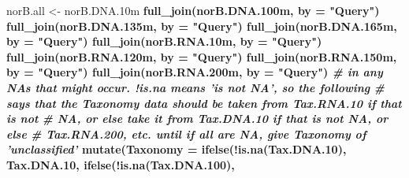 \documentclass[11 pt,]{article}
\newenvironment{Shaded}{\begin{snugshade}}{\end{snugshade}}
\newcommand{\KeywordTok}[1]{\textcolor[rgb]{0.13,0.29,0.53}{\textbf{#1}}}
\newcommand{\DataTypeTok}[1]{\textcolor[rgb]{0.13,0.29,0.53}{#1}}
\newcommand{\DecValTok}[1]{\textcolor[rgb]{0.00,0.00,0.81}{#1}}
\newcommand{\StringTok}[1]{\textcolor[rgb]{0.31,0.60,0.02}{#1}}
\newcommand{\CommentTok}[1]{\textcolor[rgb]{0.56,0.35,0.01}{\textit{#1}}}
\newcommand{\OperatorTok}[1]{\textcolor[rgb]{0.81,0.36,0.00}{\textbf{#1}}}
\newcommand{\NormalTok}[1]{#1}
\begin{document}
\begin{Shaded}
\begin{Highlighting}[]
\NormalTok{norB.all <-}\StringTok{ }\NormalTok{norB.DNA.10m }\OperatorTok{%
\KeywordTok{full_join}\NormalTok{(norB.DNA.100m, }\DataTypeTok{by =} \StringTok{"Query"}\NormalTok{) }\OperatorTok{%
\StringTok{    }\KeywordTok{full_join}\NormalTok{(norB.DNA.135m, }\DataTypeTok{by =} \StringTok{"Query"}\NormalTok{) }\OperatorTok{%
\StringTok{    }\KeywordTok{full_join}\NormalTok{(norB.DNA.165m, }\DataTypeTok{by =} \StringTok{"Query"}\NormalTok{) }\OperatorTok{%
\StringTok{    }\KeywordTok{full_join}\NormalTok{(norB.RNA.10m, }\DataTypeTok{by =} \StringTok{"Query"}\NormalTok{) }\OperatorTok{%
\StringTok{    }\KeywordTok{full_join}\NormalTok{(norB.RNA.120m, }\DataTypeTok{by =} \StringTok{"Query"}\NormalTok{) }\OperatorTok{%
\StringTok{    }\KeywordTok{full_join}\NormalTok{(norB.RNA.150m, }\DataTypeTok{by =} \StringTok{"Query"}\NormalTok{) }\OperatorTok{%
\StringTok{    }\KeywordTok{full_join}\NormalTok{(norB.RNA.200m, }\DataTypeTok{by =} \StringTok{"Query"}\NormalTok{) }\OperatorTok{%
\CommentTok{# in any NAs that might occur. !is.na means 'is not NA', so the following}
\CommentTok{# says that the Taxonomy data should be taken from Tax.RNA.10 if that is not}
\CommentTok{# NA, or else take it from Tax.DNA.10 if that is not NA, or else}
\CommentTok{# Tax.RNA.200, etc. until if all are NA, give Taxonomy of 'unclassified'}
\KeywordTok{mutate}\NormalTok{(}\DataTypeTok{Taxonomy =} \KeywordTok{ifelse}\NormalTok{(}\OperatorTok{!}\KeywordTok{is.na}\NormalTok{(Tax.DNA.}\DecValTok{10}\NormalTok{), Tax.DNA.}\DecValTok{10}\NormalTok{, }\KeywordTok{ifelse}\NormalTok{(}\OperatorTok{!}\KeywordTok{is.na}\NormalTok{(Tax.DNA.}\DecValTok{100}\NormalTok{), }
}}}}}}}}
\end{Highlighting}
\end{Shaded}
\end{document}
